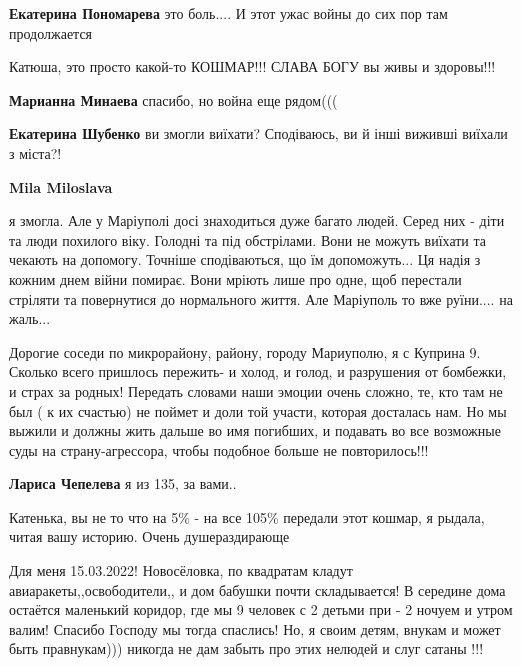 \begin{itemize} %
\textbf{Екатерина Пономарева} это боль.... И этот ужас войны до сих пор там продолжается
\end{itemize} %


Катюша, это просто какой-то КОШМАР!!! СЛАВА БОГУ вы живы и здоровы!!!🙏🙏🙏🙏

\begin{itemize} %
\textbf{Марианна Минаева} спасибо, но война еще рядом(((

\textbf{Екатерина Шубенко} ви змогли виїхати? Сподіваюсь, ви й інші виживші виїхали з міста?!

\textbf{Mila Miloslava} 

я змогла. Але у Маріуполі досі знаходиться дуже багато людей. Серед них - діти
та люди похилого віку. Голодні та під обстрілами. Вони не можуть виїхати та
чекають на допомогу. Точніше сподіваються, що їм допоможуть... Ця надія з
кожним днем війни помирає. Вони мріють лише про одне, щоб перестали стріляти та
повернутися до нормального життя. Але Маріуполь то вже руїни.... на жаль...

\end{itemize} %


Дорогие соседи по микрорайону, району, городу Мариуполю, я с Куприна 9. Сколько
всего пришлось пережить- и холод, и голод, и разрушения от бомбежки, и страх за
родных! Передать словами наши эмоции очень сложно, те, кто там не был ( к их
счастью) не поймет и доли той участи, которая досталась нам. Но мы выжили и
должны жить дальше во имя погибших, и подавать во все возможные суды на
страну-агрессора, чтобы подобное больше не повторилось!!!

\begin{itemize} %
\textbf{Лариса Чепелева} я из 135, за вами..
\end{itemize} %


Катенька, вы не то что на 5\% - на все 105\% передали этот кошмар, я рыдала,
читая вашу историю. Очень душераздирающе


Для меня 15.03.2022! Новосёловка, по квадратам кладут
авиаракеты,,освободители,, и дом бабушки почти складывается! В середине дома
остаётся маленький коридор, где мы 9 человек с 2 детьми при - 2 ночуем и утром
валим! Спасибо Господу мы тогда спаслись! Но, я своим детям, внукам и может
быть правнукам))) никогда не дам забыть про этих нелюдей и слуг сатаны !!!

